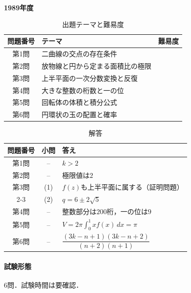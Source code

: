 \documentclass[../../main.tex]{subfiles}
\begin{document}
\begin{center}
  {\fontsize{48pt}{58pt}\selectfont \textbf{1989}\normalsize\textbf{年度}}
\end{center}

\begin{table}[htb]
  \centering
  \caption{出題テーマと難易度}
  \begin{tabular}{|c|p{9cm}|c|}
    \hline
    \textbf{問題番号} & \textbf{テーマ} & \textbf{難易度} \\
    \hline
    第1問 & 二曲線の交点の存在条件 & \\
    \hline
    第2問 & 放物線と円から定まる面積比の極限 & \\
    \hline
    第3問 & 上半平面の一次分数変換と反復 & \\
    \hline
    第4問 & 大きな整数の桁数と一の位 & \\
    \hline
    第5問 & 回転体の体積と積分公式 & \\
    \hline
    第6問 & 円環状の玉の配置と確率 & \\
    \hline
  \end{tabular}
\end{table}

\begin{table}[htb]
  \centering
  \caption{解答}
  \renewcommand{\arraystretch}{1.4}
  \begin{tabular}{|c|c|p{9cm}|}
    \hline
    \textbf{問題番号} & \textbf{小問} & \textbf{答え} \\
    \hline
    第1問 & -- & $k>2$ \\
    \hline
    第2問 & -- & 極限値は$2$ \\
    \hline
    第3問 & (1) & $f(z)$も上半平面に属する（証明問題） \\
    \cline{2-3}
    & (2) & $q=6\pm2\sqrt{5}$ \\
    \hline
    第4問 & -- & 整数部分は$200$桁，一の位は$9$ \\
    \hline
    第5問 & -- & $V=2\pi\displaystyle\int_0^1xf(x)\,dx=\pi$ \\
    \hline
    第6問 & -- & $\dfrac{(3k-n+1)(3k-n+2)}{(n+2)(n+1)}$ \\
    \hline
  \end{tabular}
\end{table}

\paragraph{試験形態}
6問．試験時間は要確認．
\end{document}
